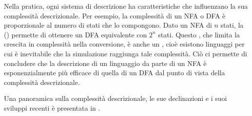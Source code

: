 Nella pratica, ogni sistema di descrizione ha caratteristiche che influenzano la sua complessità descrizionale. Per esempio, la complessità di un NFA o DFA è proporzionale al numero di stati che lo compongono. Dato un NFA di $n$ stati, la  (\cite{Rabin:59:NFA}) permette di ottenere un DFA equivalente con $2^n$ stati. Questo , che limita la crescita in complessità nella conversione, è anche un , cioè esistono linguaggi per cui è inevitabile che la simulazione raggiunga tale complessità. Ciò ci permette di concludere che la descrizione di un linguaggio da parte di un NFA è esponenzialmente più efficace di quella di un DFA dal punto di vista della complessità descrizionale.

Una panoramica sulla complessità descrizionale, le sue declinazioni e i suoi sviluppi recenti è presentata in \cite{Kutrib:21:descriptional}.
